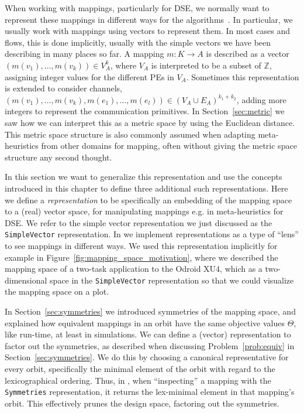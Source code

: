When working with mappings, particularly for \ac{DSE}, we normally want to represent these mappings in different ways for the algorithms~\cite{goens_mcsoc18}.
In particular, we usually work with mappings using vectors to represent them.
In most cases and flows, this is done implicitly, usually with the simple vectors we have been describing in many places so far.
A mapping $m : K \rightarrow A$ is described as a vector $\left( m(v_1), \ldots, m(v_k) \right) \in V_A^k$, where $V_A$ is interpreted to be a subset of $\mathbb{Z}$, assigning integer values for the different \acp{PE} in $V_A$.
Sometimes this representation is extended to consider channels, $\left( m(v_1), \ldots, m(v_k),m(e_1),\ldots,m(e_l) \right) \in (V_A \cup E_A)^{k_1 + k_2}$, adding more integers to represent the communication primitives.
In Section~\ref{sec:metric} we saw how we can interpret this as a metric space by using the Euclidean distance.
This metric space structure is also commonly assumed when adapting meta-heuristics from other domains for mapping, often without giving the metric space structure any second thought.

In this section we want to generalize this representation and use the concepts introduced in this chapter to define three additional such representations.
Here we define a \emph{representation} to be specifically an embedding of the mapping space to a (real) vector space, for manipulating mappings e.g. in meta-heuristics for \ac{DSE}. 
We refer to the simple vector representation we just discussed as the \texttt{SimpleVector} representation.
In \mocasin we implement representations as a type of ``lens'' to see mappings in different ways.
We used this representation implicitly for example in Figure~\ref{fig:mapping_space_motivation}, where we described the mapping space of a two-task application to the Odroid XU4, which as a two-dimensional space in the \texttt{SimpleVector} representation so that we could visualize the mapping space on a plot.

In Section~\ref{sec:symmetries} we introduced symmetries of the mapping space, and explained how equivalent mappings in an orbit have the same objective values $\Theta$, like run-time, at least in simulations.
We can define a (vector) representation to factor out the symmetries, as described when discussing Problem~\ref{prob:equiv} in Section~\ref{sec:symmetries}.
We do this by choosing a canonical representative for every orbit, specifically the minimal element of the orbit with regard to the lexicographical ordering.
Thus, in \mocasin , when ``inspecting'' a mapping with the \texttt{Symmetries} representation, it returns the lex-minimal element in that mapping's orbit.
This effectively prunes the design space, factoring out the symmetries.

